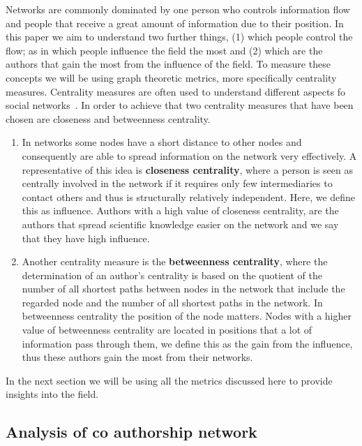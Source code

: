 \documentclass{article}
\theoremstyle{definition}
\begin{document}
Networks are commonly dominated by one person who controls information flow and
people that receive a great amount of information due to their position.
In this paper we aim to understand two further things, (1) which people control the flow;
as in which people influence the field the most and (2) which are the authors that
gain the most from the influence of the field.
To measure these concepts we will be using graph theoretic metrics, more specifically
centrality measures. Centrality measures are often used to understand different
aspects fo social networks~\cite{Landherr2010}. In order to achieve that two
centrality measures that have been chosen are closeness and betweenness
centrality.

\begin{enumerate}
    \item In networks some nodes have a short distance to other nodes and consequently
    are able to spread information on the network very effectively.
    A representative of this idea is \textbf{closeness centrality}, where a person is seen
    as centrally involved in the network if it requires only few intermediaries
    to contact others and thus is structurally relatively independent. Here,
    we define this as influence. Authors with a high value of closeness centrality,
    are the authors that spread scientific knowledge easier on the network
    and we say that they have high influence.
    \item Another centrality measure is the \textbf{betweenness centrality},
    where the determination of an author's centrality is based on the quotient of
    the number of all shortest paths between nodes in the network that include
    the regarded node and the number of all shortest paths in the network.
    In betweenness centrality the position of the node matters. Nodes
    with a higher value of betweenness centrality are located in positions that
    a lot of information pass through them, we define this as the gain from
    the influence, thus these authors gain the most from their networks.
\end{enumerate}

In the next section we will be using all the metrics discussed here to provide
insights into the field.

\subsection{Analysis of co authorship network}\label{section:results}
\end{document}
